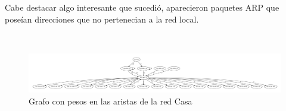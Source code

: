 Cabe destacar algo interesante que sucedi\'o, aparecieron paquetes ARP que
pose\'ian direcciones que no pertenecian a la red local.

~
\FloatBarrier

\begin{figure}[!h]
	\begin{center}
		  \includegraphics[scale=0.23]{resultados/casa/conectividad.pdf}
		  \caption{Grafo con pesos en las aristas de la red Casa}
		  \label{fig:contra1}
	\end{center}
\end{figure}

\FloatBarrier

~

